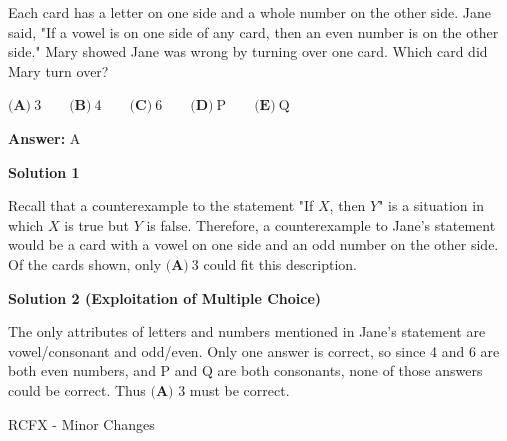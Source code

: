 \begin{enumerate}
 Each card has a letter on one side and a whole number on the other side.  Jane said, "If a vowel is on one side of any card, then an even number is on the other side."  Mary showed Jane was wrong by turning over one card.  Which card did Mary turn over?


 $\textbf{(A)}\ 3 \qquad \textbf{(B)}\ 4 \qquad \textbf{(C)}\ 6 \qquad \textbf{(D)}\ \text{P} \qquad \textbf{(E)}\ \text{Q}$

 \textbf{Answer: }A



\textbf{Solution 1}

Recall that a counterexample to the statement "If $X$, then $Y$" is a situation in which $X$ is true but $Y$ is false.  Therefore, a counterexample to Jane's statement would be a card with a vowel on one side and an odd number on the other side. Of the cards shown, only $\boxed{\textbf{(A)}\ 3}$ could fit this description.

 



\textbf{Solution 2 (Exploitation of Multiple Choice)}

The only attributes of letters and numbers mentioned in Jane's statement are vowel/consonant and odd/even.  Only one answer is correct, so since 4 and 6 are both even numbers, and P and Q are both consonants, none of those answers could be correct.  Thus $\boxed{\textbf{(A) }3}$ must be correct.

 RCFX - Minor Changes

 


\end{enumerate}